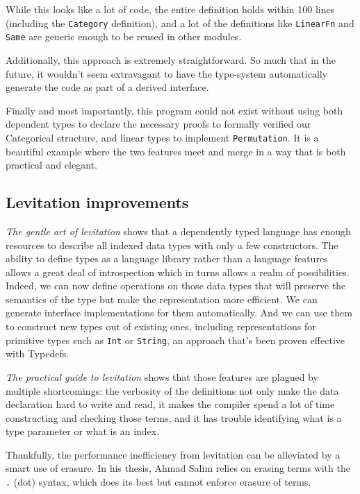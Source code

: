 \documentclass[
]{article}
\begin{document}
While this looks like a lot of code, the entire definition holds within
100 lines (including the \texttt{Category} definition), and a lot of the
definitions like \texttt{LinearFn} and \texttt{Same} are generic enough
to be reused in other modules.

Additionally, this approach is extremely straightforward. So much that
in the future, it wouldn't seem extravagant to have the type-system
automatically generate the code as part of a derived interface.

Finally and most importantly, this program could not exist without using
both dependent types to declare the necessary proofs to formally
verified our Categorical structure, and linear types to implement
\texttt{Permutation}. It is a beautiful example where the two features
meet and merge in a way that is both practical and elegant.

\hypertarget{levitation-improvements}{%
\subsection{Levitation improvements}\label{levitation-improvements}}

\emph{The gentle art of levitation}\cite{levitation} shows that a
dependently typed language has enough resources to describe all indexed
data types with only a few constructors. The ability to define types as
a language library rather than a language features allows a great deal
of introspection which in turns allows a realm of possibilities. Indeed,
we can now define operations on those data types that will preserve the
semantics of the type but make the representation more efficient. We can
generate interface implementations for them automatically. And we can
use them to construct new types out of existing
ones\cite{category_of_containers}\cite{delta_for_data}\cite{indexed_containers},
including representations for primitive types such as \texttt{Int} or
\texttt{String}, an approach that's been proven effective with
Typedefs\cite{typedefs}.

\emph{The practical guide to levitation}\cite{levitation} shows that
those features are plagued by multiple shortcomings: the verbosity of
the definitions not only make the data declaration hard to write and
read, it makes the compiler spend a lot of time constructing and
checking those terms, and it has trouble identifying what is a type
parameter or what is an index.

Thankfully, the performance inefficiency from levitation can be
alleviated by a smart use of erasure. In his thesis, Ahmad Salim relies
on erasing terms with the \texttt{.} (dot) syntax, which does its best
but cannot enforce erasure of terms.
\end{document}
